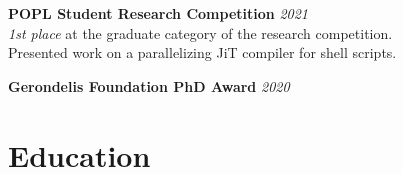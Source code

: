 \documentclass[margin]{res}
\begin{document}
\begin{resume}
\textbf{POPL Student Research Competition} \hfill {\em 2021} \\
\textit{1st place} at the graduate category of the research competition. \\
Presented work on a parallelizing JiT compiler for shell scripts. 

\textbf{Gerondelis Foundation PhD Award} \hfill {\em 2020}







\section{Education}
\hypertarget{sec:education}{}


\end{resume}
\end{document}
